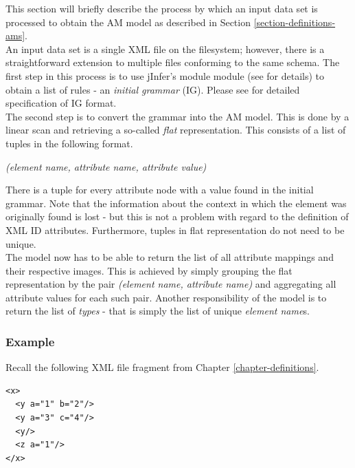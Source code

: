 This section will briefly describe the process by which an input data set is processed to obtain the AM model as described in Section \ref{section-definitions-ams}.\\

An input data set is a single XML file on the filesystem; however, there is a straightforward extension to multiple files conforming to the same schema. The first step in this process is to use jInfer's module  module (see \cite{basiciggdoc} for details) to obtain a list of rules - an \textit{initial grammar} (IG). 
Please see \cite{archdoc} for detailed specification of IG format.\\

The second step is to convert the grammar into the AM model. This is done by a linear scan and retrieving a so-called \textit{flat} representation. This consists of a list of tuples in the following format.

\begin{center}
\textit{(element name, attribute name, attribute value)}
\end{center}

There is a tuple for every attribute node with a value found in the initial grammar. Note that the information about the context in which the element was originally found is lost - but this is not a problem with regard to the definition of XML ID attributes. Furthermore, tuples in flat representation do not need to be unique.\\

The model now has to be able to return the list of all attribute mappings and their respective images. This is achieved by simply grouping the flat representation by the pair \textit{(element name, attribute name)} and aggregating all attribute values for each such pair. Another responsibility of the model is to return the list of \textit{types} - that is simply the list of unique \textit{element name}s.

\subsubsection{Example}

Recall the following XML file fragment from Chapter \ref{chapter-definitions}.
\begin{verbatim}
<x>
  <y a="1" b="2"/>
  <y a="3" c="4"/>
  <y/>
  <z a="1"/>
</x>
\end{verbatim}

